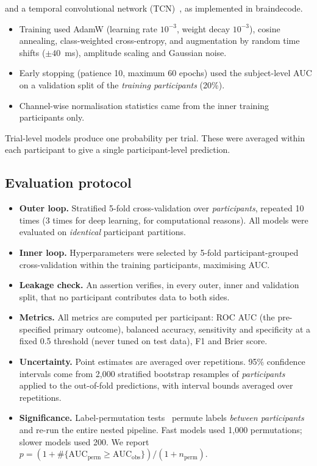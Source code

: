 \begin{itemize}
        and a temporal convolutional network (TCN)~\cite{bai2018tcn,gemein2020machine}, as implemented in
        braindecode.
        \begin{itemize}
          \item Training used AdamW (learning rate $10^{-3}$, weight decay $10^{-3}$), cosine annealing,
                class-weighted cross-entropy, and augmentation by random time shifts ($\pm40$~ms), amplitude
                scaling and Gaussian noise.
          \item Early stopping (patience 10, maximum 60 epochs) used the subject-level AUC on a validation split of
                the \emph{training participants} (20\%).
          \item Channel-wise normalisation statistics came from the inner training participants only.
        \end{itemize}
\end{itemize}
Trial-level models produce one probability per trial. These were averaged within each participant to give a single
participant-level prediction.

\subsection{Evaluation protocol}
\begin{itemize}
  \item \textbf{Outer loop.} Stratified 5-fold cross-validation over \emph{participants}, repeated 10 times
        (3 times for deep learning, for computational reasons). All models were evaluated on \emph{identical}
        participant partitions.
  \item \textbf{Inner loop.} Hyperparameters were selected by 5-fold participant-grouped cross-validation within the
        training participants, maximising AUC.
  \item \textbf{Leakage check.} An assertion verifies, in every outer, inner and validation split, that no
        participant contributes data to both sides.
  \item \textbf{Metrics.} All metrics are computed per participant: ROC AUC (the pre-specified primary outcome),
        balanced accuracy, sensitivity and specificity at a fixed 0.5 threshold (never tuned on test data), F1 and
        Brier score.
  \item \textbf{Uncertainty.} Point estimates are averaged over repetitions. 95\% confidence intervals come from
        2{,}000 stratified bootstrap resamples of \emph{participants} applied to the out-of-fold predictions, with
        interval bounds averaged over repetitions.
  \item \textbf{Significance.} Label-permutation tests~\cite{combrisson2015exceeding} permute labels \emph{between
        participants} and re-run the entire nested pipeline. Fast models used 1{,}000 permutations; slower models
        used 200. We report $p=(1+\#\{\text{AUC}_\text{perm}\ge\text{AUC}_\text{obs}\})/(1+n_\text{perm})$.
\end{itemize}


